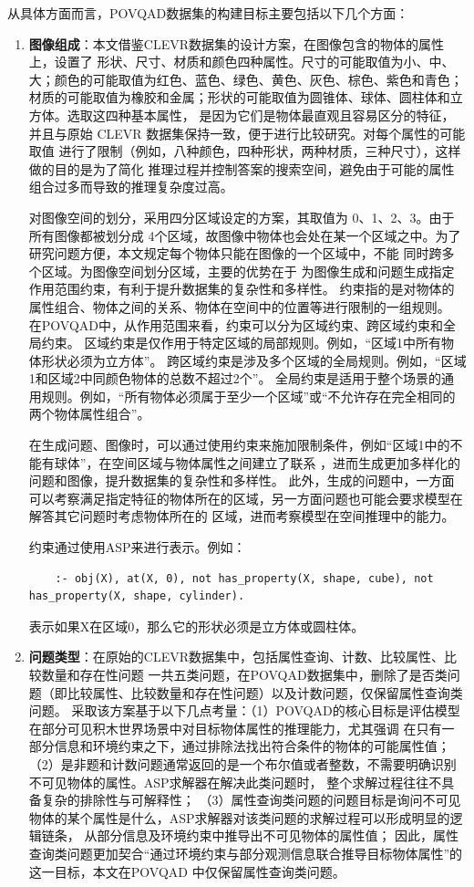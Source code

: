 从具体方面而言，POVQAD数据集的构建目标主要包括以下几个方面：
\begin{enumerate}[itemsep=0pt,parsep=0pt]
\item \textbf{图像组成}：本文借鉴CLEVR数据集的设计方案，在图像包含的物体的属性上，设置了
形状、尺寸、材质和颜色四种属性。尺寸的可能取值为小、中、大；颜色的可能取值为红色、蓝色、绿色、黄色、灰色、棕色、紫色和青色；
材质的可能取值为橡胶和金属；形状的可能取值为圆锥体、球体、圆柱体和立方体。选取这四种基本属性，
是因为它们是物体最直观且容易区分的特征，并且与原始 CLEVR 数据集保持一致，便于进行比较研究。对每个属性的可能取值
进行了限制（例如，八种颜色，四种形状，两种材质，三种尺寸），这样做的目的是为了简化
推理过程并控制答案的搜索空间，避免由于可能的属性组合过多而导致的推理复杂度过高。

对图像空间的划分，采用四分区域设定的方案，其取值为 0、1、2、3。由于所有图像都被划分成
4个区域，故图像中物体也会处在某一个区域之中。为了研究问题方便，本文规定每个物体只能在图像的一个区域中，不能
同时跨多个区域。为图像空间划分区域，主要的优势在于
为图像生成和问题生成指定作用范围约束，有利于提升数据集的复杂性和多样性。
约束指的是对物体的属性组合、物体之间的关系、物体在空间中的位置等进行限制的一组规则。
在POVQAD中，从作用范围来看，约束可以分为区域约束、跨区域约束和全局约束。
区域约束是仅作用于特定区域的局部规则。例如，“区域1中所有物体形状必须为立方体”。
跨区域约束是涉及多个区域的全局规则。例如，“区域1和区域2中同颜色物体的总数不超过2个”。
全局约束是适用于整个场景的通用规则。例如，“所有物体必须属于至少一个区域”或“不允许存在完全相同的两个物体属性组合”。

在生成问题、图像时，可以通过使用约束来施加限制条件，例如“区域1中的不能有球体”，在空间区域与物体属性之间建立了联系
，进而生成更加多样化的问题和图像，提升数据集的复杂性和多样性。
此外，生成的问题中，一方面可以考察满足指定特征的物体所在的区域，另一方面问题也可能会要求模型在解答其它问题时考虑物体所在的
区域，进而考察模型在空间推理中的能力。

约束通过使用ASP来进行表示。例如：
\begin{lstlisting}
    :- obj(X), at(X, 0), not has_property(X, shape, cube), not has_property(X, shape, cylinder).
\end{lstlisting}
表示如果X在区域0，那么它的形状必须是立方体或圆柱体。
\item \textbf{问题类型}：在原始的CLEVR数据集中，包括属性查询、计数、比较属性、比较数量和存在性问题
一共五类问题，在POVQAD数据集中，删除了是否类问题（即比较属性、比较数量和存在性问题）以及计数问题，仅保留属性查询类问题。
采取该方案基于以下几点考量：（1）POVQAD的核心目标是评估模型在部分可见积木世界场景中对目标物体属性的推理能力，尤其强调
在只有一部分信息和环境约束之下，通过排除法找出符合条件的物体的可能属性值；
（2）是非题和计数问题通常返回的是一个布尔值或者整数，不需要明确识别不可见物体的属性。ASP求解器在解决此类问题时，
整个求解过程往往不具备复杂的排除性与可解释性；
（3）属性查询类问题的问题目标是询问不可见物体的某个属性是什么，ASP求解器对该类问题的求解过程可以形成明显的逻辑链条，
从部分信息及环境约束中推导出不可见物体的属性值；
因此，属性查询类问题更加契合“通过环境约束与部分观测信息联合推导目标物体属性”的这一目标，本文在POVQAD
中仅保留属性查询类问题。


\end{enumerate}
